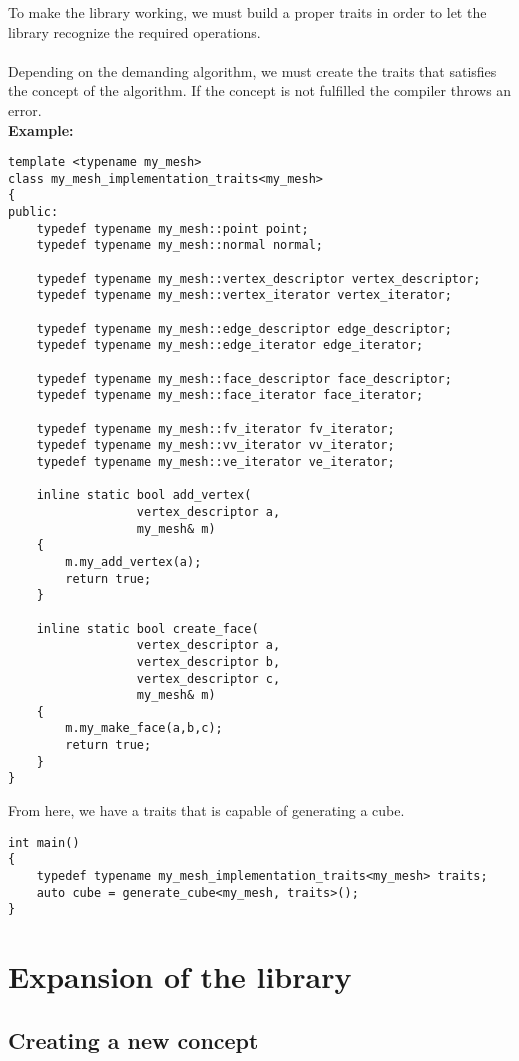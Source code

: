 \begin{appendices}
To make the library working, we must build a proper traits in order to let the library recognize
the required operations.\\
\\
Depending on the demanding algorithm, we must create the traits that satisfies the concept
of the algorithm. If the concept is not fulfilled the compiler throws an error.\\

\textbf{Example:}

\begin{lstlisting}
template <typename my_mesh>
class my_mesh_implementation_traits<my_mesh>
{
public:
	typedef typename my_mesh::point point;
	typedef typename my_mesh::normal normal;

	typedef typename my_mesh::vertex_descriptor vertex_descriptor;
	typedef typename my_mesh::vertex_iterator vertex_iterator;

	typedef typename my_mesh::edge_descriptor edge_descriptor;
	typedef typename my_mesh::edge_iterator edge_iterator;

	typedef typename my_mesh::face_descriptor face_descriptor;
	typedef typename my_mesh::face_iterator face_iterator;

	typedef typename my_mesh::fv_iterator fv_iterator;
	typedef typename my_mesh::vv_iterator vv_iterator;
	typedef typename my_mesh::ve_iterator ve_iterator;
	
	inline static bool add_vertex(
				  vertex_descriptor a,
		  	  	  my_mesh& m)
	{
		m.my_add_vertex(a);
		return true;
	}		
	
	inline static bool create_face(
				  vertex_descriptor a,
				  vertex_descriptor b,
				  vertex_descriptor c,
		  	  	  my_mesh& m)
	{
		m.my_make_face(a,b,c);
		return true;
	}
}
\end{lstlisting}

From here, we have a traits that is capable of generating a cube.

\begin{lstlisting}
int main()
{
	typedef typename my_mesh_implementation_traits<my_mesh> traits;
	auto cube = generate_cube<my_mesh, traits>();
}
\end{lstlisting}

\chapter{Expansion of the library}

\section{Creating a new concept}


\end{appendices}
